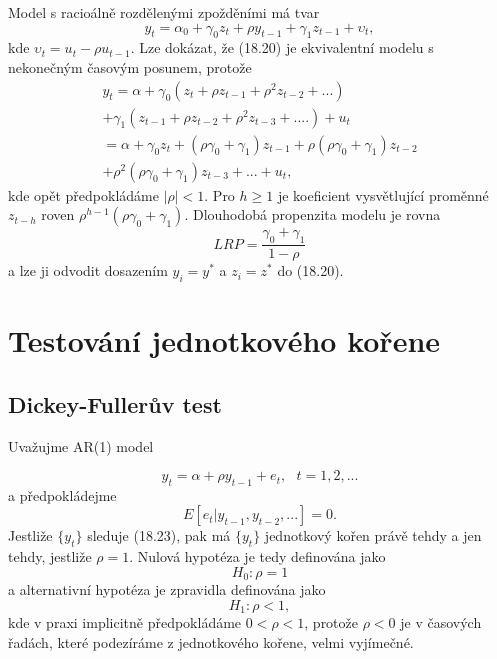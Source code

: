 Model s racioálně rozdělenými zpožděními má tvar
\begin{equation}
y_t = \alpha_0 + \gamma_0 z_t + \rho y_{t-1} + \gamma_1 z_{t-1} + \upsilon_t,
\end{equation}
kde $\upsilon_t = u_t - \rho u_{t-1}$. Lze dokázat, že (18.20) je ekvivalentní modelu s nekonečným časovým 
posunem, protože
\begin{multline}
y_t = \alpha + \gamma_0(z_t + \rho z_{t-1} + \rho^2 z_{t-2} + ...)\\
+ \gamma_1(z_{t - 1} + \rho z_{t-2} + \rho^2 z_{t-3} + ....) + u_t\\
= \alpha + \gamma_0 z_t + (\rho \gamma_0 + \gamma_1)z_{t-1} + \rho(\rho \gamma_0 + \gamma_1) z_{t-2}\\
+ \rho^2(\rho \gamma_0 + \gamma_1)z_{t-3} + ... + u_t,
\end{multline}
kde opět předpokládáme $|\rho| < 1$. Pro $h \ge 1$ je koeficient vysvětlující proměnné $z_{t-h}$ roven 
$\rho^{h-1}(\rho \gamma_0 + \gamma_1)$. Dlouhodobá propenzita modelu je rovna
\begin{equation}
LRP = \frac{\gamma_0 + \gamma_1}{1 - \rho}
\end{equation}
a lze ji odvodit dosazením $y_i = y^*$ a $z_i = z^*$ do (18.20).

\section{Testování jednotkového kořene}

\subsection{Dickey-Fullerův test}

Uvažujme AR(1) model

\begin{equation}
y_t = \alpha + \rho y_{t-1} + e_t,  ~~~ t = 1, 2, ...
\end{equation}
a předpokládejme
\begin{equation}
E[e_t|y_{t-1}, y_{t-2}, ...] = 0.
\end{equation}
Jestliže $\{y_t\}$ sleduje (18.23), pak má $\{y_t\}$ jednotkový 
kořen právě tehdy a jen tehdy, jestliže $\rho = 1$. Nulová 
hypotéza je tedy definována jako
\begin{equation}
H_0: \rho = 1
\end{equation}
a alternativní hypotéza je zpravidla definována jako
\begin{equation}
H_1: \rho < 1,
\end{equation}
kde v praxi implicitně předpokládáme $0 < \rho < 1$, protože $\rho < 0$ je v časových řadách, které 
podezíráme z jednotkového kořene, velmi vyjímečné.

